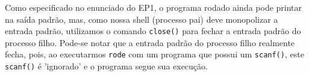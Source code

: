\documentclass[a4paper, 12pt]{article}
\begin{document}
Como especificado no enunciado do EP1, o programa rodado ainda pode printar na saída padrão, mas, como nossa shell (processo pai) deve monopolizar a entrada padrão, utilizamos o comando \texttt{close()} para fechar a entrada padrão do processo filho. Pode-se notar que a entrada padrão do processo filho realmente fecha, pois, ao executarmos \texttt{rode} com um programa que possui um \texttt{scanf()}, este \texttt{scanf()} é 'ignorado' e o programa segue sua execução.
\end{document}
